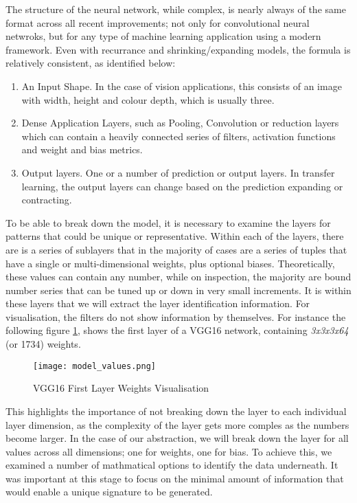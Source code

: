The structure of the neural network, while complex, is nearly always of the same format across all recent improvements; not only for convolutional neural netwroks, but for any type of machine learning application using a modern framework. Even with recurrance and shrinking/expanding models, the formula is relatively consistent, as identified below:

\begin{enumerate}
\item An Input Shape. In the case of vision applications, this consists of an image with width, height and colour depth, which is usually three.
\item Dense Application Layers, such as Pooling, Convolution or reduction layers which can contain a heavily connected series of filters, activation functions and weight and bias metrics.
\item Output layers. One or a number of prediction or output layers. In transfer learning, the output layers can change based on the prediction expanding or contracting.
\end{enumerate}

To be able to break down the model, it is necessary to examine the layers for patterns that could be unique or representative. Within each of the layers, there are is a series of sublayers that in the majority of cases are a series of tuples that have a single or multi-dimensional weights, plus optional biases. Theoretically, these values can contain any number, while on inspection, the majority are bound number series that can be tuned up or down in very small increments. It is within these layers that we will extract the layer identification information. For visualisation, the filters do not show information by themselves. For instance the following figure \ref{fig:vggWeightVisualisation}, shows the first layer of a VGG16 network\cite{brownlee_how_2019}, containing \textit{3x3x3x64} (or 1734) weights.

\begin{figure}[!ht]
    \centering
    \texttt{[image: model\_values.png]}
    \caption{VGG16 First Layer Weights Visualisation}
    \label{fig:vggWeightVisualisation}
\end{figure}

This highlights the importance of not breaking down the layer to each individual layer dimension, as the complexity of the layer gets more comples as the numbers become larger. In the case of our abstraction, we will break down the layer for all values across all dimensions; one for weights, one for bias. To achieve this, we examined a number of mathmatical options to identify the data underneath. It was important at this stage to focus on the minimal amount of information that would enable a unique signature to be generated.

